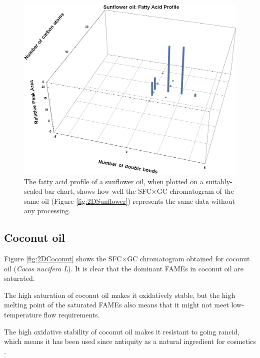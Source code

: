 \begin{figure}
\centering
\includegraphics[width=\textwidth]{Figures/BarChart.png}
\decoRule

\caption[3D Bar chart of fatty acid profile]{The fatty acid profile of a
sunflower oil, when plotted on a suitably-scaled bar chart, shows how well the
SFC×GC chromatogram of the same oil (Figure \ref{fig:2DSunflower}) represents
the same data without any processing.}

\label{fig:2DSunflowerBarChart}
\end{figure}

\subsection{Coconut oil}

Figure \ref{fig:2DCoconut} shows the SFC×GC chromatogram obtained for coconut
oil (\textit{Cocos nucifera L}). It is clear that the dominant FAMEs in coconut
oil are saturated.

The high saturation of coconut oil makes it oxidatively stable, but the high
melting point of the saturated FAMEs also means that it might not meet
low-temperature flow requirements.

The high oxidative stability of coconut oil makes it resistant to going rancid,
which means it has been used since antiquity as a natural ingredient for cosmetics
\autocite{Berdick1972}.

